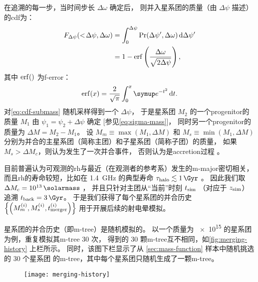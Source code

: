 在追溯的每一步，当时间步长 $\Delta\omega$ 确定后，
则并入星系团的质量（由 $\Delta\psi$ 描述）的\ac{cdf}为：
\begin{align}
  F_{\Delta\psi}(<\!\Delta\psi, \Delta\omega)
    & = \int_0^{\Delta\psi} \mathrm{Pr}(\Delta\psi', \Delta\omega)
      \,\mathrm{d}\Delta\psi' \\
    & = 1 - \operatorname{erf} \left( \frac{\Delta\omega}{\sqrt{2\Delta\psi}} \right) ,
  \label{eq:cdf-submass}
\end{align}
其中 $\operatorname{erf}()$ 为\ac{f-error}：
\begin{equation}
  \erf(x) = \frac{2}{\sqrt{\pi}} \int_0^x \Ce^{-t^2} \,\D{t} .
\end{equation}
对\autoref{eq:cdf-submass} 随机采样得到一个 $\Delta\psi$，
于是星系团 $M_2$ 的一个\ac{progenitor}的质量 $M_1$
由 $\psi_1 = \psi_2 + \Delta\psi$ 确定 [参见\autoref{eq:sigma-mass}]，
同时另一个\ac{progenitor}的质量为 $\Delta M = M_2 - M_1$。
设 $M_m \equiv \max(M_1, \Delta M)$ 和 $M_s \equiv \min(M_1, \Delta M)$
分别为并合的主星系团（简称主团）和子星系团（简称子团）的质量，
如果 $M_s > \Delta M_c$，则认为发生了一次并合事件，
否则认为是\ac{accretion}过程 \cite{randall2002}。

目前普遍认为可观测的\ac{rh}与最近（在观测者的参考系）发生的\ac{m-major}密切相关，
而且\ac{rh}的寿命较短，比如在 \SI{1.4}{\GHz} 的典型寿命
$\tau_{\R{halo}} \lesssim \SI{1}{\Gyr}$ \cite{brunetti2009,cassano2016}。
因此我们取 $\Delta M_c = \SI{e13}{\solarmass}$ \cite{cassano2005}，
并且只针对主团从\enquote{当前}时刻 $t_{\mathrm{sim}}$ （对应于 $z_{\mathrm{sim}}$）
追溯 $t_{\R{back}} = \SI{3}{\Gyr}$。
于是我们获得了每个星系团的并合历史
$\left\{\left( M_m^{(i)}, M_s^{(i)}, t_{\mathrm{merger}}^{(i)} \right)\right\}$
用于开展后续的射电晕模拟。

星系团的并合历史（即\ac{m-tree}）是随机模拟的。
以一个质量为 \SI{e15}{\solarmass} 的星系团为例，重复模拟其\ac{m-tree} 30 次，
得到的 30 颗\ac{m-tree}互不相同，如\autoref{fig:merging-history} 上栏所示。
同时，该图下栏显示了从 \autoref{sec:mass-function} 样本中随机挑选的 30 个星系团
的\ac{m-tree}，其中每个星系团只随机生成了一颗\ac{m-tree}。

\begin{figure}[htp]
  \centering
  \texttt{[image: merging-history]}
  \label{fig:merging-history}
\end{figure}

